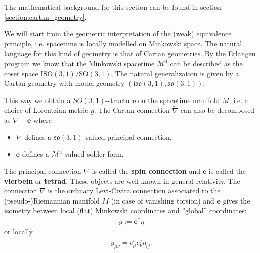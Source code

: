     The mathematical background for this section can be found in section \ref{section:cartan_geometry}.

    We will start from the geometric interpretation of the (weak) equivalence principle, i.e. spacetime is locally modelled on Minkowski space. The natural language for this kind of geometry is that of Cartan geometries. By the Erlangen program we know that the Minkowski spacetime $\mathcal{M}^4$ can be described as the coset space $\text{ISO}(3,1)/\text{SO}(3,1)$. The natural generalization is given by a Cartan geometry with model geometry $(\mathfrak{iso}(3,1), \mathfrak{so}(3,1))$.

    \begin{property}
        This way we obtain a $SO(3,1)$-structure on the spacetime manifold $M$, i.e. a choice of Lorentzian metric $g$. The Cartan connection $\widetilde{\nabla}$ can also be decomposed as $\nabla+\mathbf{e}$ where
        \begin{itemize}
            \item $\nabla$ defines a $\mathfrak{so}(3,1)$-valued principal connection.
            \item $\mathbf{e}$ defines a $\mathcal{M}^4$-valued solder form.
        \end{itemize}
        The principal connection $\nabla$ is called the \textbf{spin connection} and $\mathbf{e}$ is called the \textbf{vierbein} or \textbf{tetrad}. These objects are well-known in general relativity. The connection $\nabla$ is the ordinary Levi-Civita connection associated to the (pseudo-)Riemannian manifold $M$ (in case of vanishing torsion) and $\mathbf{e}$ gives the isometry between local (flat) Minkowski coordinates and ''global'' coordinates:
        \begin{gather}
            g := \mathbf{e}^*\eta
        \end{gather}
        or locally
        \begin{gather}
            g_{\mu\nu} = e^i_\mu e^j_\nu\eta_{ij}.
        \end{gather}
    \end{property}

